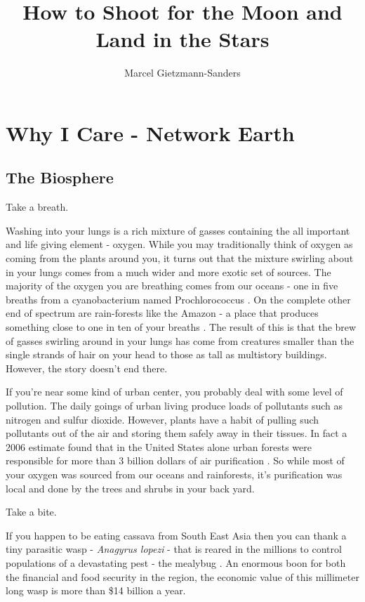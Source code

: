 \documentclass[11pt,a5paper]{book}
\title{How to Shoot for the Moon and Land in the Stars}
\author{Marcel Gietzmann-Sanders}
\date{}
\begin{document}
\maketitle
\tableofcontents
\newpage
\chapter{Why I Care - Network Earth}
\section{The Biosphere}
Take a breath. 
\newline

Washing into your lungs is a rich mixture of gasses containing the all important and life giving element - oxygen. While you may traditionally think of oxygen as coming from the plants around you, it turns out that the mixture swirling about in your lungs comes from a much wider and more exotic set of sources. The majority of the oxygen you are breathing comes from our oceans - one in five breaths from a cyanobacterium named Prochlorococcus \cite{kmorsink}. On the complete other end of spectrum are rain-forests like the Amazon - a place that produces something close to one in ten of your breaths \cite{ymalhi}. The result of this is that the brew of gasses swirling around in your lungs has come from creatures smaller than the single strands of hair on your head to those as tall as multistory buildings. However, the story doesn't end there.
\newline

If you're near some kind of urban center, you probably deal with some level of pollution. The daily goings of urban living produce loads of pollutants such as nitrogen and sulfur dioxide. However, plants have a habit of pulling such pollutants out of the air and storing them safely away in their tissues. In fact a 2006 estimate found that in the United States alone urban forests were responsible for more than 3 billion dollars of air purification \cite{dnowak}. So while most of your oxygen was sourced from our oceans and rainforests, it's purification was local and done by the trees and shrubs in your back yard. 
\newline

Take a bite. 
\newline 

If you happen to be eating cassava from South East Asia then you can thank a tiny parasitic wasp - \textit{Anagyrus lopezi} - that is reared in the millions to control populations of a devastating pest - the mealybug \cite{wpark}. An enormous boon for both the financial and food security in the region, the economic value of this millimeter long wasp is more than \$14 billion a year. 
\newline
\end{document}
